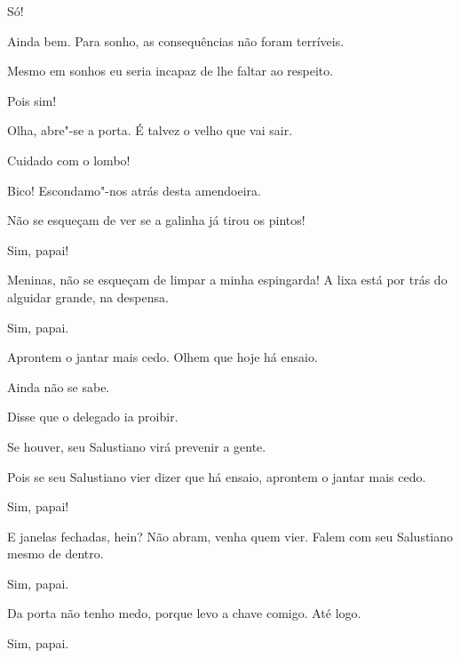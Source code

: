  Só!

 Ainda bem. Para sonho, as
consequências não foram terríveis.  

  
Mesmo em sonhos eu seria incapaz de lhe faltar ao respeito.

 Pois sim!

  Olha, abre"-se a porta. É
talvez o velho que vai sair.

 Cuidado com o lombo!

 Bico!
Escondamo"-nos atrás desta amendoeira.



  Não se esqueçam de ver se a galinha
já tirou os pintos!

 Sim, papai!

 Meninas, não se esqueçam
de limpar a minha espingarda! A lixa está por trás
do alguidar grande, na despensa.

  Sim, papai.

 Aprontem o jantar mais cedo. Olhem que hoje há ensaio.

  Ainda não se sabe. 

  Disse que o delegado ia proibir. 

 Se houver, seu Salustiano virá prevenir a gente. 

 Pois se seu
Salustiano vier dizer que há ensaio, aprontem o
jantar mais cedo. 

 Sim, papai!

  E janelas fechadas, hein? Não abram, venha quem vier. Falem com
seu Salustiano mesmo de dentro. 

 Sim, papai.

  Da porta não tenho medo, porque
levo a chave comigo.  Até logo. 

 Sim, papai.



